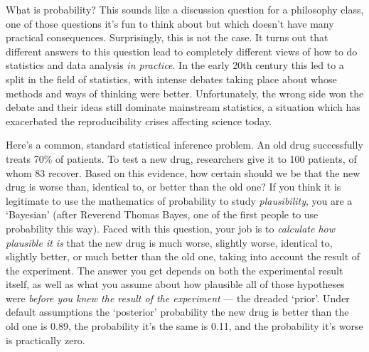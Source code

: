 \documentclass[a4paper, 12pt]{article}
\title{}
\author{Brendon J. Brewer}
\begin{document}
\sffamily
\maketitle

What is probability? This sounds like a discussion question for a
philosophy class, one of those questions it's fun to think about but which
doesn't have many practical consequences. Surprisingly, this is not the case.
It turns out that different answers to this question lead to completely
different views of how to do statistics and data analysis {\em in practice}.
In the early 20th century this led to a split in the field of statistics,
with intense debates taking place about whose methods and ways of thinking
were better. Unfortunately, the wrong side won the debate and their
ideas still dominate mainstream statistics, a situation which
has exacerbated the reproducibility crises affecting science today.

Here's a common, standard statistical inference problem. An old drug
successfully treats 70\% of patients. To test a new drug, researchers give it
to 100 patients, of whom 83 recover. Based on this evidence, how certain
should we be that the new drug is worse than, identical to, or better than the
old one? If you think it is legitimate to use the mathematics of probability
to study {\em plausibility}, you are a `Bayesian' (after Reverend
Thomas Bayes, one of the first people to use probability this way). Faced with
this question, your job is to {\em calculate how plausible it is} that the new
drug is much worse, slightly worse, identical to, slightly better, or much better
than the old one, taking into account the result of the experiment. The answer
you get
depends on both the experimental result itself, as well as what you assume
about how plausible all of those hypotheses were {\em before you knew the result
of the experiment} --- the dreaded `prior'.
Under default assumptions the `posterior' probability the new drug is better
than the old one is 0.89, the probability it's the same is 0.11, and the
probability it's worse is practically zero.
\end{document}
